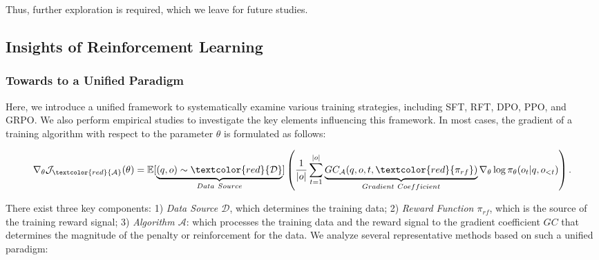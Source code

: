 \begin{itemize}[topsep=0pt]
\begin{itemize}[topsep=0pt]
Thus, further exploration is required, which we leave for future studies.

\subsection{Insights of Reinforcement Learning}
\subsubsection{Towards to a Unified Paradigm} Here, we introduce a unified framework to systematically examine various training strategies, including SFT, RFT, DPO, PPO, and GRPO. We also perform empirical studies to investigate the key elements influencing this framework. In most cases, the gradient of a training algorithm with respect to the parameter $\theta$ is formulated as follows:

\begin{equation}
    \nabla_{\theta}\mathcal{J}_{\textcolor{red}{\mathcal{A}}}(\theta) = \mathbb{E}[\underbrace{(q,o) \sim \textcolor{red}{\mathcal{D}}}_{Data \ Source}]\left( \frac{1}{|o|} \sum_{t=1}^{|o|}  \underbrace{GC_{{\mathcal{A}}}(q, o, t, \textcolor{red}{\pi_{{rf}}})}_{Gradient \ Coefficient}  \nabla_{\theta}\log \pi_{\theta}(o_t | q, o_{<t})\right).
\label{eq:objective}
\end{equation}

There exist three key components: 1) \textit{Data Source $\mathcal{D}$}, which determines the training data; 2) \textit{Reward Function $\pi_{{rf}}$}, which is the source of the training reward signal; 3) \textit{Algorithm $\mathcal{A}$}: which processes the training data and the reward signal to the gradient coefficient $GC$ that determines the magnitude of the penalty or reinforcement for the data. We analyze several representative methods based on such a unified paradigm:


\end{itemize}
\end{itemize}
